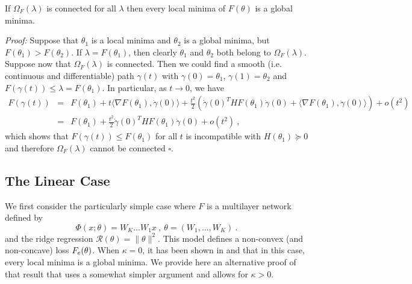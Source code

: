\begin{proposition}
If $\Omega_F(\lambda)$ is connected for all $\lambda$ then every local minima of $F(\theta)$ is a global minima. 
\end{proposition}
{\it Proof:} Suppose that $\theta_1$ is a local minima and $\theta_2$ is a global minima, 
but $F(\theta_1) > F(\theta_2)$. If $\lambda = F(\theta_1)$, then clearly 
$\theta_1$ and $\theta_2$ both belong to $\Omega_F(\lambda)$. Suppose 
now that $\Omega_F(\lambda)$ 
is connected. Then we could find a smooth (i.e. continuous and differentiable) path $\gamma(t)$ 
with $\gamma(0) = \theta_1$, $\gamma(1)= \theta_2$ and $F(\gamma(t)) \leq \lambda = F(\theta_1)$.
In particular, as $t \to 0$, we have
\begin{eqnarray*}
F(\gamma(t)) &=& F(\theta_1) + t \langle \nabla F(\theta_1) , \dot{\gamma}(0) \rangle + \frac{t^2}{2} \left(\dot{\gamma}(0)^T H F(\theta_1) \dot{\gamma}(0) + \langle \nabla F(\theta_1), \ddot{\gamma}(0) \rangle \right) + o(t^2) \\
&=& F(\theta_1) +   \frac{t^2}{2}  \dot{\gamma}(0)^T H F(\theta_1) \dot{\gamma}(0)  + o(t^2) ~,
\end{eqnarray*}
which shows that $F(\gamma(t)) \leq F(\theta_1)$ for all $t$ is incompatible with $H(\theta_1) \succeq 0$ and therefore $\Omega_F(\lambda)$ cannot be connected $\square$.


\subsection{The Linear Case}

We first consider the 
particularly simple case where 
$F$ is a multilayer network defined by
\begin{equation}
\label{linearcase}
\Phi(x;\theta) = W_K \dots W_1 x~,~\theta = (W_1, \dots, W_K)~.
\end{equation}
and the ridge regression $\mathcal{R}(\theta) =\| \theta \|^2$. This model defines a non-convex (and non-concave) loss $F_{e}(\theta)$.
When $\kappa = 0$, it has been shown in \cite{ganguli} and \cite{linearcase} that in this case, 
every local minima is a global minima.  
We provide here an alternative proof of that result that uses
a somewhat simpler argument and allows for $\kappa > 0$. 


